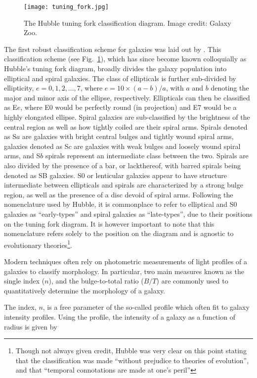 \begin{figure}[!ht]
  \centering
  \texttt{[image: tuning\_fork.jpg]}
  \caption{The Hubble tuning fork classification diagram.  Image
    credit: Galaxy Zoo.}
  \label{fig:tuning_fork}
\end{figure}

The first robust classification scheme for galaxies was laid out by
\citet{hubble1926}.  This classification scheme (see
Fig.~\ref{fig:tuning_fork}), which has since become known colloquially
as Hubble's tuning fork diagram, broadly divides the galaxy
population into elliptical and spiral galaxies.  The class of
ellipticals is further sub-divided by ellipticity, $e = 0,1,2,...,7$,
where $e = 10 \times (a-b)/a$, with $a$ and $b$ denoting the major and
minor axis of the ellipse, respectively.  Ellipticals can then be
classified as E$e$, where E$0$ would be perfectly round (in
projection) and E$7$ would be a highly elongated ellipse.  Spiral
galaxies are sub-classified by the brightness of the central region as
well as how tightly coiled are their spiral arms.  Spirals denoted as
S$a$ are galaxies with bright central bulges and tightly wound spiral
arms, galaxies denoted as S$c$ are galaxies with weak bulges and
loosely wound spiral arms, and S$b$ spirals represent an intermediate
class between the two.  Spirals are also divided by the presence of a
bar, or lackthereof, with barred spirals being denoted as SB galaxies.
S$0$ or lenticular galaxies appear to have structure intermediate
between ellipticals and spirals are characterized by a strong bulge
region, as well as the presence of a disc devoid of spiral arms.
Following the nomenclature used by Hubble, it is commonplace to refer
to elliptical and S0 galaxies as ``early-types'' and spiral galaxies
as ``late-types'', due to their positions on the tuning fork diagram.
It is however important to note that this nomenclature refers solely
to the position on the diagram and is agnostic to evolutionary
theories\footnote{Though not always given credit, Hubble was
  very clear on this point stating that the classification was made
  ``without prejudice to theories of evolution'', and that ``temporal
  connotations are made at one's peril''}.
\par
Modern techniques often rely on photometric measurements of 
light profiles of a galaxies to classify morphology.  In particular, two
main measures known as the single \ser index ($n$), and the
bulge-to-total ratio ($B/T$) are commonly used to quantitatively determine
the morphology of a galaxy.
\par
The \ser index, $n$, is a free parameter of the so-called
\ser profile \citep{sersic1968} which often fit to galaxy
intensity profiles.  Using the \ser profile, the intensity of a
galaxy as a function of radius is given by 

